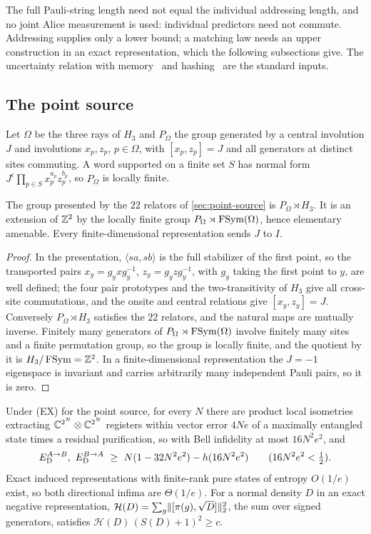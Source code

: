 The full Pauli-string length need not equal the individual addressing length, and no joint Alice measurement is used:
individual predictors need not commute. Addressing supplies only a lower bound; a matching law needs an upper construction in
an exact representation, which the following subsections give. The uncertainty relation with memory~\cite{BCCRR10} and
hashing~\cite{DW05} are the standard inputs.

\subsection{The point source}\label{sec:exact-point}

Let $\Omega$ be the three rays of $H_3$ and $P_\Omega$ the group generated by a central involution $J$ and involutions $x_p,z_p$,
$p\in\Omega$, with $[x_p,z_p]=J$ and all generators at distinct sites commuting. A word supported on a finite set $S$ has normal
form $J^\epsilon\prod_{p\in S}x_p^{a_p}z_p^{b_p}$, so $P_\Omega$ is locally finite.

\begin{proposition}\label{prop:point-structure}
The group presented by the $22$ relators of \cref{sec:point-source} is $P_\Omega\rtimes H_3$. It is an extension of $\mathbb Z^2$ by the locally
finite group $P_\Omega\rtimes\operatorname{FSym}(\Omega)$, hence elementary amenable. Every finite-dimensional representation sends $J$ to $I$.
\end{proposition}

\begin{proof}
In the presentation, $\langle sa,sb\rangle$ is the full stabilizer of the first point, so the transported pairs
$x_y=g_yxg_y^{-1}$, $z_y=g_yzg_y^{-1}$, with $g_y$ taking the first point to $y$, are well defined; the four pair prototypes and
the two-transitivity of $H_3$ give all cross-site commutations, and the onsite and central relations give $[x_y,z_y]=J$.
Conversely $P_\Omega\rtimes H_3$ satisfies the $22$ relators, and the natural maps are mutually inverse. Finitely many generators of
$P_\Omega\rtimes\operatorname{FSym}(\Omega)$ involve finitely many sites and a finite permutation group, so the group is locally finite, and the
quotient by it is $H_3/\operatorname{FSym}=\mathbb Z^2$. In a finite-dimensional representation the $J=-1$ eigenspace is invariant and carries
arbitrarily many independent Pauli pairs, so it is zero.
\end{proof}

\begin{theorem}\label{thm:exact-point}
Under (EX) for the point source, for every $N$ there are product local isometries extracting $\mathbb C^{2^N}\otimes\mathbb C^{2^N}$ registers within
vector error $4Ne$ of a maximally entangled state times a residual purification, so with Bell infidelity at most $16N^2e^2$, and
\[
\ED^{A\to B},\ \ED^{B\to A}\ \ge\ N(1-32N^2e^2)-h(16N^2e^2)\qquad(16N^2e^2<\tfrac12).
\]
Exact induced representations with finite-rank pure states of entropy $O(1/e)$ exist, so both directional infima are $\Theta(1/e)$.
For a normal density $D$ in an exact negative representation, $\mathcal H(D)=\sum_g\lVert [\pi(g),\sqrt D]\rVert_2^2$, the sum over signed
generators, satisfies $\mathcal H(D)\,(S(D)+1)^2\ge c$.
\end{theorem}

